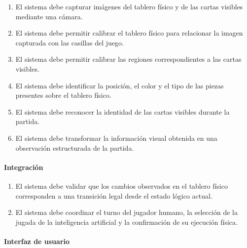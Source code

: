 \begin{enumerate}[label=\textbf{RF-\twodigits*:}, leftmargin=2.2cm, resume]
    \item El sistema debe capturar imágenes del tablero físico y de las cartas visibles mediante una cámara.

    \item El sistema debe permitir calibrar el tablero físico para relacionar la imagen capturada con las casillas del juego.

    \item El sistema debe permitir calibrar las regiones correspondientes a las cartas visibles.

    \item El sistema debe identificar la posición, el color y el tipo de las piezas presentes sobre el tablero físico.

    \item El sistema debe reconocer la identidad de las cartas visibles durante la partida.

    \item El sistema debe transformar la información visual obtenida en una observación estructurada de la partida.
\end{enumerate}

\paragraph{Integración}

\begin{enumerate}[label=\textbf{RF-\twodigits*:}, leftmargin=2.2cm, resume]
    \item El sistema debe validar que los cambios observados en el tablero físico corresponden a una transición legal desde el estado lógico actual.

    \item El sistema debe coordinar el turno del jugador humano, la selección de la jugada de la inteligencia artificial y la confirmación de su ejecución física.
\end{enumerate}

\paragraph{Interfaz de usuario}

